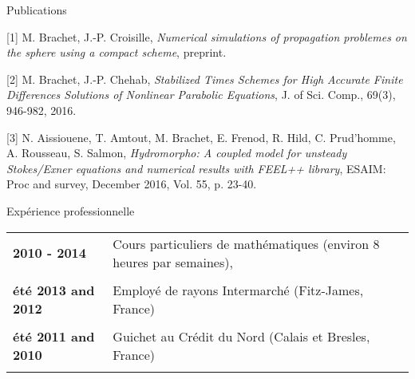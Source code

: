 \documentclass[10pt,a4paper]{report}
\begin{document}
\vspace{.5cm}
\newpage
\noindent
{\selectfont
\begin{Large}
Publications
\end{Large}
\hrulefill
}
\vspace{0.5cm}

[1] {\sc  M. Brachet, J.-P. Croisille}, {\sl Numerical simulations of propagation problemes on the sphere using a compact scheme}, preprint.

\vspace{0.6cm}

[2] {\sc M. Brachet, J.-P. Chehab}, {\sl Stabilized Times Schemes for High Accurate Finite Differences Solutions of Nonlinear Parabolic Equations}, J. of Sci. Comp., 69(3), 946-982, 2016.

\vspace{0.6cm}

[3] {\sc  N. Aissiouene, T. Amtout, M. Brachet, E. Frenod, R. Hild, C. Prud'homme, A. Rousseau, S. Salmon}, {\sl  Hydromorpho: A coupled model for unsteady Stokes/Exner equations and numerical results with FEEL++ library}, ESAIM: Proc and survey, December 2016, Vol. 55, p. 23-40.






\vspace{1cm}
\noindent
{\selectfont
\begin{Large}
Expérience professionnelle
\end{Large}
\hrulefill
}

\noindent
\begin{center}
\begin{tabular}{p{5cm} p{10cm}}
\textbf{2010 - 2014} & Cours particuliers de mathématiques (environ 8 heures par semaines),\\

& \\

\textbf{été 2013 and 2012} & Employé de rayons Intermarché (Fitz-James, France) \\

& \\

\textbf{été 2011 and 2010} & Guichet au Crédit du Nord (Calais et Bresles, France) \\

& \\

\end{tabular}
\end{center}
\end{document}
